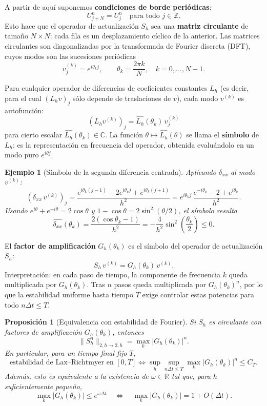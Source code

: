 \documentclass[a4paper,11pt]{report}
\newtheorem{proposition}[theorem]{Proposición}
\newtheorem{example}[theorem]{Ejemplo}
\begin{document}
A partir de aquí suponemos \textbf{condiciones de borde periódicas}:
\[
  U_{j+N}^n = U_j^n \quad \text{para todo } j\in\mathbb{Z}.
\]
Esto hace que el operador de actualización $S_h$ sea una \textbf{matriz circulante} de tamaño $N\times N$: cada fila es un desplazamiento cíclico de la anterior. Las matrices circulantes son diagonalizadas por la transformada de Fourier discreta (DFT), cuyos modos son las sucesiones periódicas
\[
  v_j^{(k)}=e^{i\theta_k j},\qquad \theta_k=\frac{2\pi k}{N},\quad k=0,\dots,N-1.
\]

Para cualquier operador de diferencias de coeficientes constantes $L_h$ (es decir, para el cual $(L_h v)_j$ sólo depende de traslaciones de $v$), cada modo $v^{(k)}$ es autofunción:
\[
  (L_h v^{(k)})_j = \widehat{L_h}(\theta_k)\, v_j^{(k)}
\]
para cierto escalar $\widehat{L_h}(\theta_k)\in\mathbb{C}$. La función $\theta\mapsto\widehat{L_h}(\theta)$ se llama el \textbf{símbolo} de $L_h$: es la representación en frecuencia del operador, obtenida evaluándolo en un modo puro $e^{i\theta j}$.

\begin{example}[Símbolo de la segunda diferencia centrada]
Aplicando $\delta_{xx}$ al modo $v^{(k)}$:
\[
  (\delta_{xx}\,v^{(k)})_j
  = \frac{e^{i\theta_k(j-1)}-2e^{i\theta_k j}+e^{i\theta_k(j+1)}}{h^2}
  = e^{i\theta_k j}\,\frac{e^{-i\theta_k}-2+e^{i\theta_k}}{h^2}.
\]
Usando $e^{i\theta}+e^{-i\theta}=2\cos\theta$ y $1-\cos\theta=2\sin^2(\theta/2)$, el símbolo resulta
\[
  \widehat{\delta_{xx}}(\theta_k)
  =\frac{2(\cos\theta_k-1)}{h^2}
  =-\frac{4}{h^2}\sin^2\!\left(\frac{\theta_k}{2}\right)\le 0.
\]
\end{example}

El \textbf{factor de amplificación} $G_h(\theta_k)$ es el símbolo del operador de actualización $S_h$:
\[
  S_h\,v^{(k)}=G_h(\theta_k)\,v^{(k)}.
\]
Interpretación: en cada paso de tiempo, la componente de frecuencia $k$ queda multiplicada por $G_h(\theta_k)$. Tras $n$ pasos queda multiplicada por $G_h(\theta_k)^n$, por lo que la estabilidad uniforme hasta tiempo $T$ exige controlar estas potencias para todo $n\Delta t\le T$.

\begin{proposition}[Equivalencia con estabilidad de Fourier]
Si $S_h$ es circulante con factores de amplificación $G_h(\theta_k)$, entonces
\[
\|S_h^n\|_{2,h\to2,h}=\max_k|G_h(\theta_k)|^n.
\]
En particular, para un tiempo final fijo $T$,
\[
\text{estabilidad de Lax--Richtmyer en }[0,T]
\iff
\sup_h\sup_{n\Delta t\le T}\max_k |G_h(\theta_k)|^n\le C_T.
\]
Además, esto es equivalente a la existencia de $\omega\in\mathbb{R}$ tal que, para $h$ suficientemente pequeño,
\[
\max_k|G_h(\theta_k)|\le e^{\omega\Delta t}
\quad\Longleftrightarrow\quad
\max_k|G_h(\theta_k)|=1+O(\Delta t).
\]
\end{proposition}
\end{document}
